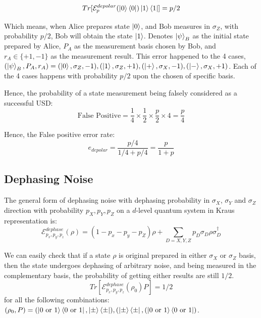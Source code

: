 \documentclass[%
 reprint,
superscriptaddress,
 amsmath,amssymb,
 aps,
]{revtex4-2}
\begin{document}
\begin{equation}
Tr[\mathcal{E}^{depolar}_p(\ket{0}\bra{0})\ket{1}\bra{1}]=p/2
\end{equation}

Which means, when Alice prepares state $\ket{0}$, and Bob measures in $\sigma_Z$, with probability $p/2$, Bob will obtain the state $\ket{1}$. Denotes $\ket{\psi}_B$ as the initial state prepared by Alice, $P_A$ as the measurement basis chosen by Bob, and $r_A\in\{+1, -1\}$ as the measurement result. This error happened to the 4 cases, $\left(\ket{\psi}_B, P_A, r_A\right)=(\ket{0},\sigma_Z, -1), (\ket{1},\sigma_Z, +1), (\ket{+},\sigma_X, -1), (\ket{-},\sigma_X, +1)$. Each of the 4 cases happens with probability $p/2$ upon the chosen of specific basis.

Hence, the probability of a state measurement being falsely considered as a successful USD:
\begin{equation}
    \text{False Positive}=\frac{1}{4}\times\frac{1}{2}\times\frac{p}{2}\times4 = \frac{p}{4}
\end{equation}

Hence, the False positive error rate:
\begin{equation}
    e_{depolar}=\frac{p/4}{1/4+p/4}=\frac{p}{1+p}
\end{equation}

\subsection{Dephasing Noise}
The general form of dephasing noise with dephasing probability in $\sigma_X$, $\sigma_Y$ and $\sigma_Z$ direction with probability $p_X, p_Y, p_Z$ on a $d$-level quantum system in Kraus representation is:
\begin{equation}
    \mathcal{E}^{dephase}_{p_x, p_y, p_z}(\rho)=(1-p_x-p_y-p_Z)\rho+\sum_{D=X, Y, Z}p_D\sigma_D\rho\sigma_D^\dagger
\end{equation}

We can easily check that if a state $\rho$ is original prepared in either $\sigma_X$ or $\sigma_Z$ basis, then the state undergoes dephasing of arbitrary noise, and being measured in the complementary basis, the probability of getting either results are still $1/2$.
\begin{equation}
    Tr[\mathcal{E}^{dephase}_{p_x, p_y, p_z}(\rho_0)P]=1/2
\end{equation}
for all the following combinations: $(\rho_0, P)=(\ket{0\text{ or }1}\bra{0\text{ or }1}, \ket{\pm}\bra{\pm}), (\ket{\pm}\bra{\pm}, (\ket{0\text{ or }1}\bra{0\text{ or }1})$.
\end{document}
